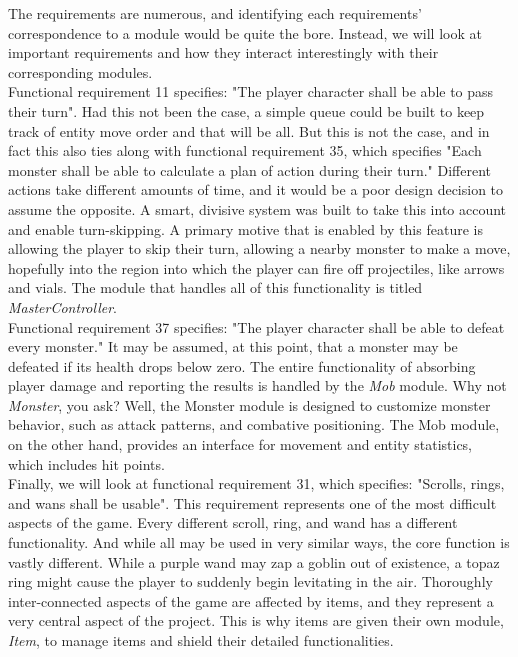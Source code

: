 \documentclass[12pt, titlepage]{article}
\begin{document}
	The requirements are numerous, and identifying each requirements' correspondence to a module would be quite the bore. Instead, we will look at important requirements and how they interact interestingly with their corresponding modules.\\

	Functional requirement 11 specifies: "The player character shall be able to pass their turn". Had this not been the case, a simple queue could be built to keep track of entity move order and that will be all. But this is not the case, and in fact this also ties along with functional requirement 35, which specifies "Each monster shall be able to calculate a plan of action during their turn." Different actions take different amounts of time, and it would be a poor design decision to assume the opposite. A smart, divisive system was built to take this into account and enable turn-skipping. A primary motive that is enabled by this feature is allowing the player to skip their turn, allowing a nearby monster to make a move, hopefully into the region into which the player can fire off projectiles, like arrows and vials. The module that handles all of this functionality is titled \textit{MasterController}.\\

	Functional requirement 37 specifies: "The player character shall be able to defeat every monster." It may be assumed, at this point, that a monster may be defeated if its health drops below zero. The entire functionality of absorbing player damage and reporting the results is handled by the \textit{Mob} module. Why not \textit{Monster}, you ask? Well, the Monster module is designed to customize monster behavior, such as attack patterns, and combative positioning. The Mob module, on the other hand, provides an interface for movement and entity statistics, which includes hit points.\\

	Finally, we will look at functional requirement 31, which specifies: "Scrolls, rings, and wans shall be usable". This requirement represents one of the most difficult aspects of the game. Every different scroll, ring, and wand has a different functionality. And while all may be used in very similar ways, the core function is vastly different. While a purple wand may zap a goblin out of existence, a topaz ring might cause the player to suddenly begin levitating in the air. Thoroughly inter-connected aspects of the game are affected by items, and they represent a very central aspect of the project. This is why items are given their own module, \textit{Item}, to manage items and shield their detailed functionalities.\\
\end{document}
